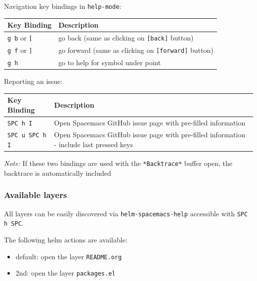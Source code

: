 \documentclass[11pt]{article}
\begin{document}
Navigation key bindings in \texttt{help-mode}:

\begin{center}
\begin{tabular}{ll}
Key Binding & Description\\
\hline
\texttt{g b} or \texttt{[} & go back (same as clicking on \texttt{[back]} button)\\
\texttt{g f} or \texttt{]} & go forward (same as clicking on \texttt{[forward]} button)\\
\texttt{g h} & go to help for symbol under point\\
\end{tabular}
\end{center}

Reporting an issue:

\begin{center}
\begin{tabular}{ll}
Key Binding & Description\\
\hline
\texttt{SPC h I} & Open Spacemacs GitHub issue page with pre-filled information\\
\texttt{SPC u SPC h I} & Open Spacemacs GitHub issue page with pre-filled information - include last pressed keys\\
\end{tabular}
\end{center}

\emph{Note:} If these two bindings are used with the \texttt{*Backtrace*} buffer open, the
backtrace is automatically included

\subsubsection{Available layers}
\label{sec:org350e07f}
All layers can be easily discovered via \texttt{helm-spacemacs-help} accessible with
\texttt{SPC h SPC}.

The following helm actions are available:
\begin{itemize}
\item default: open the layer \texttt{README.org}
\item 2nd: open the layer \texttt{packages.el}
\end{itemize}
\end{document}
